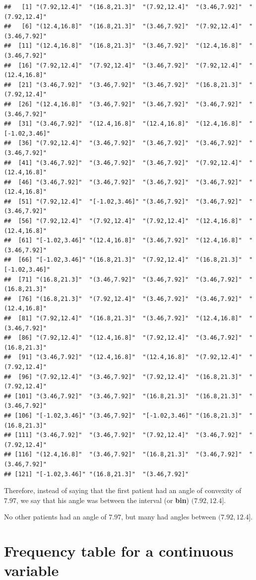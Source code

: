 \documentclass[
]{book}
\begin{document}
\begin{verbatim}
##   [1] "(7.92,12.4]"  "(16.8,21.3]"  "(7.92,12.4]"  "(3.46,7.92]"  "(7.92,12.4]" 
##   [6] "(12.4,16.8]"  "(16.8,21.3]"  "(3.46,7.92]"  "(7.92,12.4]"  "(3.46,7.92]" 
##  [11] "(12.4,16.8]"  "(16.8,21.3]"  "(3.46,7.92]"  "(12.4,16.8]"  "(3.46,7.92]" 
##  [16] "(7.92,12.4]"  "(7.92,12.4]"  "(3.46,7.92]"  "(7.92,12.4]"  "(12.4,16.8]" 
##  [21] "(3.46,7.92]"  "(3.46,7.92]"  "(3.46,7.92]"  "(16.8,21.3]"  "(7.92,12.4]" 
##  [26] "(12.4,16.8]"  "(3.46,7.92]"  "(3.46,7.92]"  "(3.46,7.92]"  "(3.46,7.92]" 
##  [31] "(3.46,7.92]"  "(12.4,16.8]"  "(12.4,16.8]"  "(12.4,16.8]"  "[-1.02,3.46]"
##  [36] "(7.92,12.4]"  "(3.46,7.92]"  "(3.46,7.92]"  "(3.46,7.92]"  "(3.46,7.92]" 
##  [41] "(3.46,7.92]"  "(3.46,7.92]"  "(3.46,7.92]"  "(7.92,12.4]"  "(12.4,16.8]" 
##  [46] "(3.46,7.92]"  "(3.46,7.92]"  "(3.46,7.92]"  "(3.46,7.92]"  "(12.4,16.8]" 
##  [51] "(7.92,12.4]"  "[-1.02,3.46]" "(3.46,7.92]"  "(3.46,7.92]"  "(3.46,7.92]" 
##  [56] "(7.92,12.4]"  "(7.92,12.4]"  "(7.92,12.4]"  "(12.4,16.8]"  "(12.4,16.8]" 
##  [61] "[-1.02,3.46]" "(12.4,16.8]"  "(3.46,7.92]"  "(12.4,16.8]"  "(3.46,7.92]" 
##  [66] "[-1.02,3.46]" "(16.8,21.3]"  "(7.92,12.4]"  "(16.8,21.3]"  "[-1.02,3.46]"
##  [71] "(16.8,21.3]"  "(3.46,7.92]"  "(3.46,7.92]"  "(3.46,7.92]"  "(16.8,21.3]" 
##  [76] "(16.8,21.3]"  "(7.92,12.4]"  "(3.46,7.92]"  "(3.46,7.92]"  "(12.4,16.8]" 
##  [81] "(7.92,12.4]"  "(16.8,21.3]"  "(3.46,7.92]"  "(12.4,16.8]"  "(3.46,7.92]" 
##  [86] "(7.92,12.4]"  "(12.4,16.8]"  "(7.92,12.4]"  "(3.46,7.92]"  "(16.8,21.3]" 
##  [91] "(3.46,7.92]"  "(12.4,16.8]"  "(12.4,16.8]"  "(7.92,12.4]"  "(7.92,12.4]" 
##  [96] "(7.92,12.4]"  "(3.46,7.92]"  "(7.92,12.4]"  "(16.8,21.3]"  "(7.92,12.4]" 
## [101] "(3.46,7.92]"  "(3.46,7.92]"  "(16.8,21.3]"  "(16.8,21.3]"  "(3.46,7.92]" 
## [106] "[-1.02,3.46]" "(3.46,7.92]"  "[-1.02,3.46]" "(16.8,21.3]"  "(16.8,21.3]" 
## [111] "(3.46,7.92]"  "(3.46,7.92]"  "(7.92,12.4]"  "(3.46,7.92]"  "(7.92,12.4]" 
## [116] "(12.4,16.8]"  "(3.46,7.92]"  "(16.8,21.3]"  "(3.46,7.92]"  "(3.46,7.92]" 
## [121] "[-1.02,3.46]" "(16.8,21.3]"  "(3.46,7.92]"
\end{verbatim}

Therefore, instead of saying that the first patient had an angle of convexity of \(7.97\), we say that his angle was between the interval (or \textbf{bin}) \((7.92,12.4]\).

No other patients had an angle of \(7.97\), but many had angles between \((7.92,12.4]\).

\hypertarget{frequency-table-for-a-continuous-variable}{%
\section{Frequency table for a continuous variable}\label{frequency-table-for-a-continuous-variable}}
\end{document}
